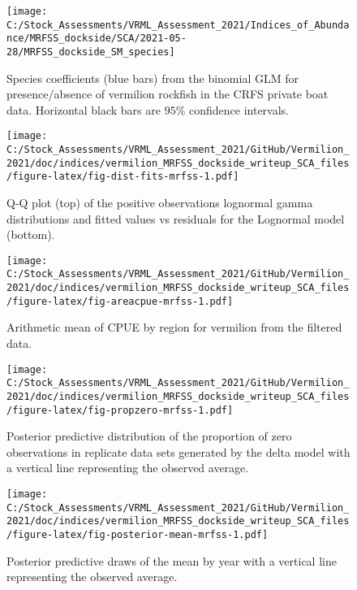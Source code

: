\documentclass[11pt,
  english,
  a4paper,
]{article}
\begin{document}
\FloatBarrier

\FloatBarrier

\begin{figure}
\texttt{[image: C:/Stock\_Assessments/VRML\_Assessment\_2021/Indices\_of\_Abundance/MRFSS\_dockside/SCA/2021-05-28/MRFSS\_dockside\_SM\_species]} \caption{Species coefficients (blue bars) from the binomial GLM for presence/absence of vermilion rockfish in the CRFS private boat data. Horizontal black bars are $95\%$ confidence intervals.}\label{fig:fig-sm-mrfss}
\end{figure}

\begin{figure}
\centering
\texttt{[image: C:/Stock\_Assessments/VRML\_Assessment\_2021/GitHub/Vermilion\_2021/doc/indices/vermilion\_MRFSS\_dockside\_writeup\_SCA\_files/figure-latex/fig-dist-fits-mrfss-1.pdf]}
\caption{\label{fig:fig-dist-fits-mrfss}Q-Q plot (top) of the positive observations lognormal gamma distributions and fitted values vs residuals for the Lognormal model (bottom).}
\end{figure}

\FloatBarrier

\begin{figure}
\centering
\texttt{[image: C:/Stock\_Assessments/VRML\_Assessment\_2021/GitHub/Vermilion\_2021/doc/indices/vermilion\_MRFSS\_dockside\_writeup\_SCA\_files/figure-latex/fig-areacpue-mrfss-1.pdf]}
\caption{\label{fig:fig-areacpue-mrfss}Arithmetic mean of CPUE by region for vermilion from the filtered data.}
\end{figure}

\begin{figure}
\centering
\texttt{[image: C:/Stock\_Assessments/VRML\_Assessment\_2021/GitHub/Vermilion\_2021/doc/indices/vermilion\_MRFSS\_dockside\_writeup\_SCA\_files/figure-latex/fig-propzero-mrfss-1.pdf]}
\caption{\label{fig:fig-propzero-mrfss}Posterior predictive distribution of the proportion of zero observations in replicate data sets generated by the delta model with a vertical line representing the observed average.}
\end{figure}

\begin{figure}
\centering
\texttt{[image: C:/Stock\_Assessments/VRML\_Assessment\_2021/GitHub/Vermilion\_2021/doc/indices/vermilion\_MRFSS\_dockside\_writeup\_SCA\_files/figure-latex/fig-posterior-mean-mrfss-1.pdf]}
\caption{\label{fig:fig-posterior-mean-mrfss}Posterior predictive draws of the mean by year with a vertical line representing the observed average.}
\end{figure}
\end{document}
